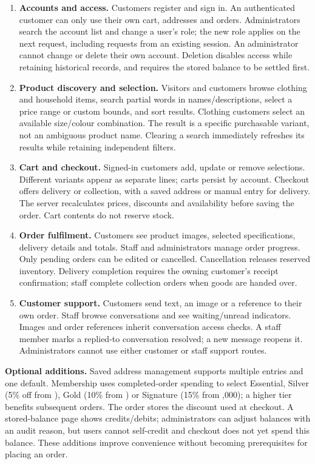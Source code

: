\begin{enumerate}
\item \textbf{Accounts and access.} Customers register and sign in. An authenticated customer can only use their own cart, addresses and orders. Administrators search the account list and change a user's role; the new role applies on the next request, including requests from an existing session. An administrator cannot change or delete their own account. Deletion disables access while retaining historical records, and requires the stored balance to be settled first.
\item \textbf{Product discovery and selection.} Visitors and customers browse clothing and household items, search partial words in names/descriptions, select a price range or custom bounds, and sort results. Clothing customers select an available size/colour combination. The result is a specific purchasable variant, not an ambiguous product name. Clearing a search immediately refreshes its results while retaining independent filters.
\item \textbf{Cart and checkout.} Signed-in customers add, update or remove selections. Different variants appear as separate lines; carts persist by account. Checkout offers delivery or collection, with a saved address or manual entry for delivery. The server recalculates prices, discounts and availability before saving the order. Cart contents do not reserve stock.
\item \textbf{Order fulfilment.} Customers see product images, selected specifications, delivery details and totals. Staff and administrators manage order progress. Only pending orders can be edited or cancelled. Cancellation releases reserved inventory. Delivery completion requires the owning customer's receipt confirmation; staff complete collection orders when goods are handed over.
\item \textbf{Customer support.} Customers send text, an image or a reference to their own order. Staff browse conversations and see waiting/unread indicators. Images and order references inherit conversation access checks. A staff member marks a replied-to conversation resolved; a new message reopens it. Administrators cannot use either customer or staff support routes.
\end{enumerate}

\textbf{Optional additions.} Saved address management supports multiple entries and one default. Membership uses completed-order spending to select Essential, Silver (5\% off from ), Gold (10\% from ) or Signature (15\% from ,000); a higher tier benefits subsequent orders. The order stores the discount used at checkout. A stored-balance page shows credits/debits; administrators can adjust balances with an audit reason, but users cannot self-credit and checkout does not yet spend this balance. These additions improve convenience without becoming prerequisites for placing an order.

